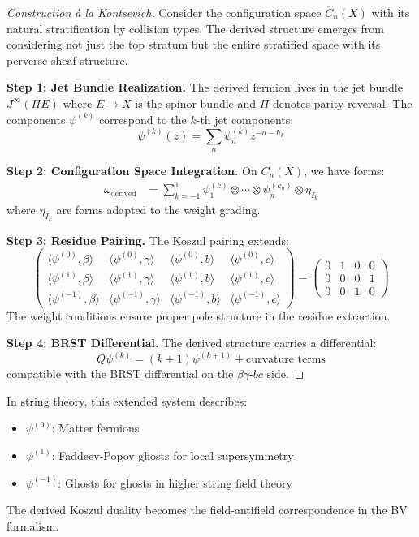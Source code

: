 \begin{proof}[Construction à la Kontsevich]
Consider the configuration space $\overline{C}_n(X)$ with its natural stratification by collision types.
The derived structure emerges from considering not just the top stratum but the entire 
stratified space with its perverse sheaf structure.

\textbf{Step 1: Jet Bundle Realization.} The derived fermion lives in the jet bundle 
$J^{\infty}(\Pi E)$ where $E \to X$ is the spinor bundle and $\Pi$ denotes parity reversal. 
The components $\psi^{(k)}$ correspond to the $k$-th jet components:
\[
\psi^{(k)}(z) = \sum_{n} \psi^{(k)}_n z^{-n-h_k}
\]

\textbf{Step 2: Configuration Space Integration.} On $\overline{C}_n(X)$, we have forms:
\begin{align}
\omega_{\text{derived}} &= \sum_{k=-1}^{1} \psi^{(k)}_1 \otimes \cdots \otimes \psi^{(k_n)}_n \otimes \eta_{I_k}
\end{align}
where $\eta_{I_k}$ are forms adapted to the weight grading.

\textbf{Step 3: Residue Pairing.} The Koszul pairing extends:
\[
\begin{pmatrix}
\langle \psi^{(0)}, \beta \rangle & \langle \psi^{(0)}, \gamma \rangle & \langle \psi^{(0)}, b \rangle & \langle \psi^{(0)}, c \rangle \\
\langle \psi^{(1)}, \beta \rangle & \langle \psi^{(1)}, \gamma \rangle & \langle \psi^{(1)}, b \rangle & \langle \psi^{(1)}, c \rangle \\
\langle \psi^{(-1)}, \beta \rangle & \langle \psi^{(-1)}, \gamma \rangle & \langle \psi^{(-1)}, b \rangle & \langle \psi^{(-1)}, c \rangle
\end{pmatrix}
=
\begin{pmatrix}
0 & 1 & 0 & 0 \\
0 & 0 & 0 & 1 \\
0 & 0 & 1 & 0
\end{pmatrix}
\]
The weight conditions ensure proper pole structure in the residue extraction.

\textbf{Step 4: BRST Differential.} The derived structure carries a differential:
\[
Q\psi^{(k)} = (k+1)\psi^{(k+1)} + \text{curvature terms}
\]
compatible with the BRST differential on the $\beta\gamma$-$bc$ side.
\end{proof}

\begin{example}
In string theory, this extended system describes:
\begin{itemize}
\item $\psi^{(0)}$: Matter fermions
\item $\psi^{(1)}$: Faddeev-Popov ghosts for local supersymmetry
\item $\psi^{(-1)}$: Ghosts for ghosts in higher string field theory
\end{itemize}
The derived Koszul duality becomes the field-antifield correspondence in the BV formalism.
\end{example}


